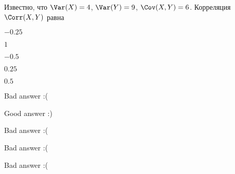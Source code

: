 
\begin{question}
Известно, что \(\Var(X)=4\), \(\Var(Y)=9\), \(\Cov(X, Y)=6\). Корреляция
\(\Corr(X, Y)\) равна
\begin{answerlist}
  \item \(-0.25\)
  \item \(1\)
  \item \(-0.5\)
  \item \(0.25\)
  \item \(0.5\)
\end{answerlist}
\end{question}

\begin{solution}
\begin{answerlist}
  \item Bad answer :(
  \item Good answer :)
  \item Bad answer :(
  \item Bad answer :(
  \item Bad answer :(
\end{answerlist}
\end{solution}


